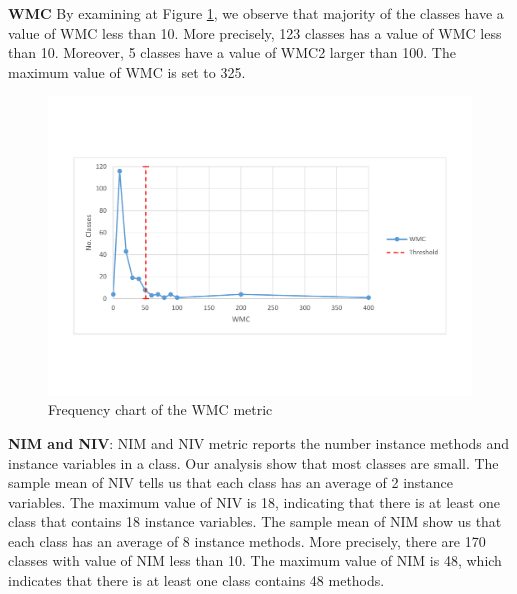 \textbf{WMC} By examining at Figure \ref{fig:wmcdistribution}, we observe that majority of the classes have a value of WMC less than 10. More precisely, 123 classes has a value of WMC less than 10. Moreover, 5 classes have a value of WMC2 larger than 100. The maximum value of WMC is set to 325.

\begin{figure}
	\centering
	\includegraphics[width=\textwidth]{images/threshold/wmc.pdf}
	\caption{Frequency chart of the WMC metric}
	\label{fig:wmcdistribution}
\end{figure}

\textbf{NIM and NIV}: NIM and NIV metric reports the number instance methods and instance variables in a class. Our analysis show that most classes are small. The sample mean of NIV tells us that each class has an average of 2 instance variables. The maximum value of NIV is 18, indicating that there is at least one class that contains 18 instance variables. The sample mean of NIM show us that each class has an average of 8 instance methods. More precisely, there are 170 classes with value of NIM less than 10. The maximum value of NIM is 48, which indicates that there is at least one class contains 48 methods. 




